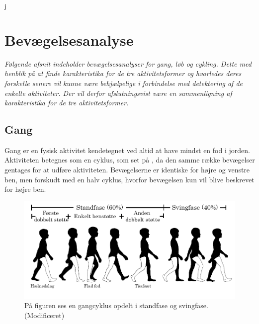   j\section{Bevægelsesanalyse} \label{bevaegelse}
%
\textit{Følgende afsnit indeholder bevægelsesanalyser for gang, løb og cykling. Dette med henblik på at finde karakteristika for de tre aktivitetsformer og hvorledes deres forskelle senere vil kunne være behjælpelige i forbindelse med detektering af de enkelte aktiviteter. Der vil derfor afslutningsvist være en sammenligning af karakteristika for de tre aktivitetsformer.}

\subsection{Gang}
Gang er en fysisk aktivitet kendetegnet ved altid at have mindst en fod i jorden. Aktiviteten betegnes som en cyklus, som set på , da den samme række bevægelser gentages for at udføre aktiviteten. Bevægelserne er identiske for højre og venstre ben, men forskudt med en halv cyklus, hvorfor bevægelsen kun vil blive beskrevet for højre ben. \citep{VaughanDavisOConnor1992,Whittle1990} 

\begin{figure}[H]
	\centering
	\includegraphics[scale=0.7]{figures/bProblemloesning/gang_cyklus.png}
	\caption{På figuren ses en gangcyklus opdelt i standfase og svingfase. \citep{VaughanDavisOConnor1992} (Modificeret)}
	\label{fig:gang_cyklus}
\end{figure}
	

